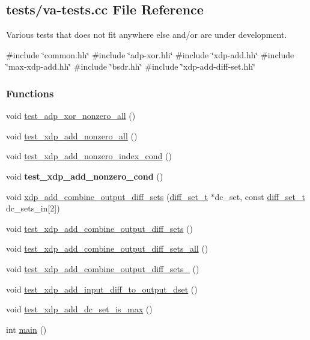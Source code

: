 \hypertarget{va-tests_8cc}{\subsection{tests/va-\/tests.cc \-File \-Reference}
\label{va-tests_8cc}
}


\-Various tests that does not fit anywhere else and/or are under development.  


{\ttfamily \#include \char`\"{}common.\-hh\char`\"{}}\*
{\ttfamily \#include \char`\"{}adp-\/xor.\-hh\char`\"{}}\*
{\ttfamily \#include \char`\"{}xdp-\/add.\-hh\char`\"{}}\*
{\ttfamily \#include \char`\"{}max-\/xdp-\/add.\-hh\char`\"{}}\*
{\ttfamily \#include \char`\"{}bsdr.\-hh\char`\"{}}\*
{\ttfamily \#include \char`\"{}xdp-\/add-\/diff-\/set.\-hh\char`\"{}}\*
\subsubsection*{\-Functions}
\begin{DoxyCompactItemize}
\item 
void \hyperlink{va-tests_8cc_aaaea695cbdec6ea9ce9d7c0416499d31}{test\-\_\-adp\-\_\-xor\-\_\-nonzero\-\_\-all} ()
\item 
void \hyperlink{va-tests_8cc_aef6e6ab18d286c1a8c2455f1265a96c0}{test\-\_\-xdp\-\_\-add\-\_\-nonzero\-\_\-all} ()
\item 
void \hyperlink{va-tests_8cc_a803b0008b0333bc063f09982f0ad53a8}{test\-\_\-xdp\-\_\-add\-\_\-nonzero\-\_\-index\-\_\-cond} ()
\item 
\hypertarget{va-tests_8cc_a16f06cd8dfa7487e84f3bf39c89a6c3a}{void {\bfseries test\-\_\-xdp\-\_\-add\-\_\-nonzero\-\_\-cond} ()}\label{va-tests_8cc_a16f06cd8dfa7487e84f3bf39c89a6c3a}

\item 
void \hyperlink{va-tests_8cc_a6849ab027a9eca0a7292a6fbe6e94cf7}{xdp\-\_\-add\-\_\-combine\-\_\-output\-\_\-diff\-\_\-sets} (\hyperlink{structdiff__set__t}{diff\-\_\-set\-\_\-t} $\ast$dc\-\_\-set, const \hyperlink{structdiff__set__t}{diff\-\_\-set\-\_\-t} dc\-\_\-sets\-\_\-in\mbox{[}2\mbox{]})
\item 
void \hyperlink{va-tests_8cc_ac981904fcaf6bcf11082ebad252eed85}{test\-\_\-xdp\-\_\-add\-\_\-combine\-\_\-output\-\_\-diff\-\_\-sets} ()
\item 
void \hyperlink{va-tests_8cc_a5c9cf224c6a7b74d27d455c2e7f3e463}{test\-\_\-xdp\-\_\-add\-\_\-combine\-\_\-output\-\_\-diff\-\_\-sets\-\_\-all} ()
\item 
void \hyperlink{va-tests_8cc_ad36fdab8d0fe68cc49555c75b459ae3e}{test\-\_\-xdp\-\_\-add\-\_\-combine\-\_\-output\-\_\-diff\-\_\-sets\-\_} ()
\item 
void \hyperlink{va-tests_8cc_aaafb7ae3f6769bba29c31d318e4b86a7}{test\-\_\-xdp\-\_\-add\-\_\-input\-\_\-diff\-\_\-to\-\_\-output\-\_\-dset} ()
\item 
void \hyperlink{va-tests_8cc_ad2008c3ddbe9e9c251c1ae66ce57433b}{test\-\_\-xdp\-\_\-add\-\_\-dc\-\_\-set\-\_\-is\-\_\-max} ()
\item 
int \hyperlink{va-tests_8cc_ae66f6b31b5ad750f1fe042a706a4e3d4}{main} ()
\end{DoxyCompactItemize}


